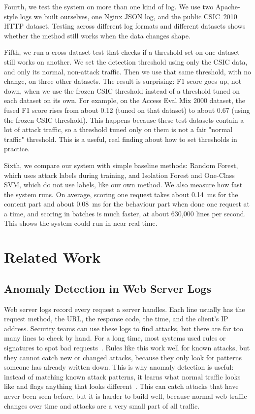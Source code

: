 \documentclass[futureinternet,article,submit,moreauthors]{Definitions/mdpi}
\begin{document}
Fourth, we test the system on more than one kind of log. We use two Apache-style logs we built ourselves, one Nginx JSON log, and the public CSIC~2010 HTTP dataset. Testing across different log formats and different datasets shows whether the method still works when the data changes shape.

Fifth, we run a cross-dataset test that checks if a threshold set on one dataset still works on another. We set the detection threshold using only the CSIC data, and only its normal, non-attack traffic. Then we use that same threshold, with no change, on three other datasets. The result is surprising: F1 score goes up, not down, when we use the frozen CSIC threshold instead of a threshold tuned on each dataset on its own. For example, on the Access Eval Mix 2000 dataset, the fused F1 score rises from about 0.12 (tuned on that dataset) to about 0.67 (using the frozen CSIC threshold). This happens because these test datasets contain a lot of attack traffic, so a threshold tuned only on them is not a fair "normal traffic" threshold. This is a useful, real finding about how to set thresholds in practice.

Sixth, we compare our system with simple baseline methods: Random Forest, which uses attack labels during training, and Isolation Forest and One-Class SVM, which do not use labels, like our own method. We also measure how fast the system runs. On average, scoring one request takes about 0.14~ms for the content part and about 0.08~ms for the behaviour part when done one request at a time, and scoring in batches is much faster, at about 630{,}000 lines per second. This shows the system could run in near real time.

\section{Related Work} \label{sec3}

\subsection{Anomaly Detection in Web Server Logs}

Web server logs record every request a server handles. Each line usually has the request method, the URL, the response code, the time, and the client's IP address. Security teams can use these logs to find attacks, but there are far too many lines to check by hand. For a long time, most systems used rules or signatures to spot bad requests~\cite{scarfone2007}. Rules like this work well for known attacks, but they cannot catch new or changed attacks, because they only look for patterns someone has already written down. This is why anomaly detection is useful: instead of matching known attack patterns, it learns what normal traffic looks like and flags anything that looks different~\cite{chandola2009}. This can catch attacks that have never been seen before, but it is harder to build well, because normal web traffic changes over time and attacks are a very small part of all traffic.
\end{document}
